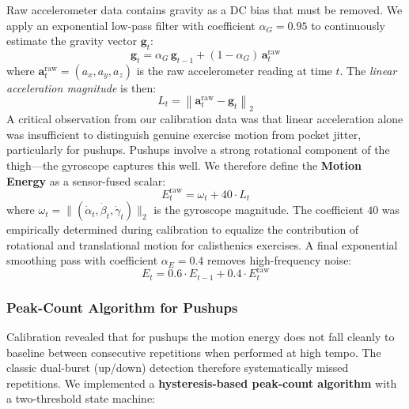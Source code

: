 \documentclass[11pt]{article}
\begin{document}
Raw accelerometer data contains gravity as a DC bias that must be removed. We apply an exponential low-pass filter with coefficient $\alpha_G = 0.95$ to continuously estimate the gravity vector $\mathbf{g}_t$:
\begin{equation}
  \mathbf{g}_t = \alpha_G \, \mathbf{g}_{t-1} + (1 - \alpha_G) \, \mathbf{a}_t^{\text{raw}}
  \label{eq:gravity_filter}
\end{equation}
where $\mathbf{a}_t^{\text{raw}} = (a_x, a_y, a_z)$ is the raw accelerometer reading at time $t$. The \textit{linear acceleration magnitude} is then:
\begin{equation}
  L_t = \left\| \mathbf{a}_t^{\text{raw}} - \mathbf{g}_t \right\|_2
  \label{eq:linear_acc}
\end{equation}
A critical observation from our calibration data was that linear acceleration alone was insufficient to distinguish genuine exercise motion from pocket jitter, particularly for pushups. Pushups involve a strong rotational component of the thigh—the gyroscope captures this well. We therefore define the \textbf{Motion Energy} as a sensor-fused scalar:
\begin{equation}
  E_t^{\text{raw}} = \omega_t + 40 \cdot L_t
  \label{eq:raw_energy}
\end{equation}
where $\omega_t = \|(\dot\alpha_t, \dot\beta_t, \dot\gamma_t)\|_2$ is the gyroscope magnitude. The coefficient $40$ was empirically determined during calibration to equalize the contribution of rotational and translational motion for calisthenics exercises. A final exponential smoothing pass with coefficient $\alpha_E = 0.4$ removes high-frequency noise:
\begin{equation}
  E_t = 0.6 \cdot E_{t-1} + 0.4 \cdot E_t^{\text{raw}}
  \label{eq:smoothed_energy}
\end{equation}

\subsubsection{Peak-Count Algorithm for Pushups}

Calibration revealed that for pushups the motion energy does not fall cleanly to baseline between consecutive repetitions when performed at high tempo. The classic dual-burst (up/down) detection therefore systematically missed repetitions. We implemented a \textbf{hysteresis-based peak-count algorithm} with a two-threshold state machine:
\end{document}
